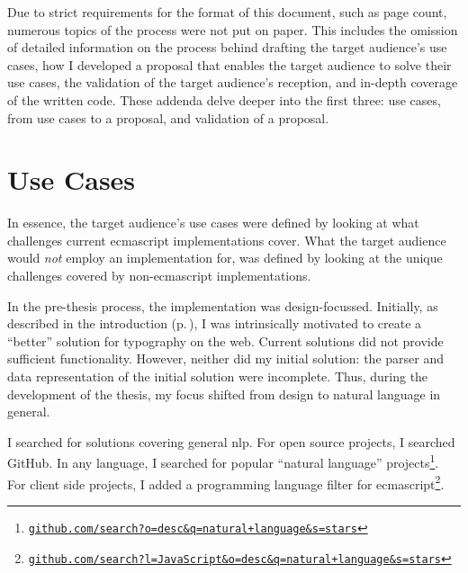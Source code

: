 
\begingroup
\let\clearpage\relax
\let\cleardoublepage\relax
\let\cleardoublepage\relax

\manualmark
{}

\noindent Due to strict requirements for the format of this document,
  such as page count, numerous topics of the process were not put on paper.
This includes the omission of detailed information on the process behind
  drafting the target audience's use cases, how I developed a proposal that
  enables the target audience to solve their use cases, the validation of the
  target audience's reception, and in-depth coverage of the written code.
These addenda delve deeper into the first three: use cases, from use cases
  to a proposal, and validation of a proposal.

\chapter*{Use Cases}\label{addendum-use-cases}

In essence, the target audience's use cases were defined by looking at what
  challenges current \gls{ecmascript} implementations cover.
What the target audience would \emph{not} employ an implementation for, was
  defined by looking at the unique challenges covered by non-\gls{ecmascript}
  implementations.

In the pre-thesis process, the implementation was design-focussed.
Initially, as described in the introduction (p.\,\pageref{introduction}), I
  was intrinsically motivated to create a ``better'' solution for typography
  on the web.
Current solutions did not provide sufficient functionality.
However, neither did my initial solution: the parser and data representation
  of the initial solution were incomplete.
Thus, during the development of the thesis, my focus shifted from design to
  natural language in general.

I searched for solutions covering general \gls{nlp}.
For open source projects, I searched GitHub.
In any language, I searched for popular ``natural language''
  projects\footnote{
    \href{https://github.com/search?o=desc&q=natural+language&s=stars}{\nolinkurl{github.com/search?o=desc&q=natural+language&s=stars}}
  }.
For client side projects, I added a programming language filter for
  \gls{ecmascript}\footnote{
    \href{https://github.com/search?l=JavaScript&o=desc&q=natural+language&s=stars}{\nolinkurl{github.com/search?l=JavaScript&o=desc&q=natural+language&s=stars}}
  }.

